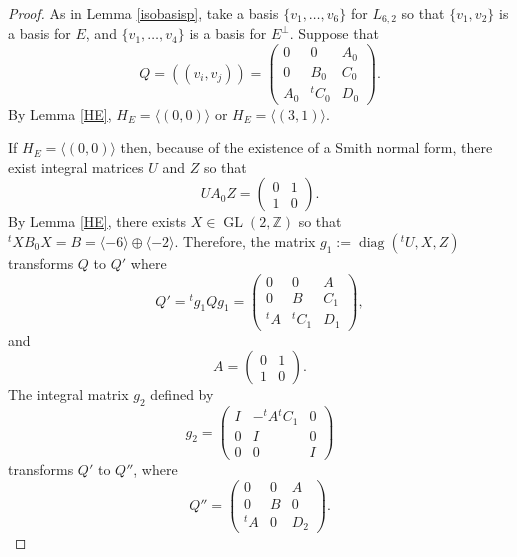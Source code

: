 \documentclass[11pt]{amsart}
\newcommand{\ZZ}{\mathbb{Z}}
\newcommand{\la}{\langle}
\newcommand{\ra}{\rangle}
\newcommand{\opn}{\operatorname}
\newcommand{\op}{\oplus}
\begin{document}
\begin{proof}
As in Lemma \ref{isobasisp}, take a basis $\{v_1, \ldots, v_6 \}$ for $L_{6,2}$ so that $\{v_1, v_2\}$ is a basis for $E$, and $\{v_1, \ldots, v_4 \}$ is a basis for $E^{\perp}$. 
Suppose that
\begin{equation*}
Q = ((v_i, v_j)) = 
\begin{pmatrix} 
0 & 0 & A_0 \\ 
0 & B_0 & C_0 \\ 
A_0 & {}^tC_0 & D_0 
\end{pmatrix}.
\end{equation*}
By Lemma \ref{HE}, $H_E = \la (0,0) \ra$ or $H_E = \la (3,1) \ra$. 

If $H_E = \la (0,0) \ra$ then, because of the existence of a Smith normal form, there exist integral matrices $U$ and $Z$ so that 
\begin{equation*}
U A_0 Z = 
\begin{pmatrix} 
0 & 1 \\ 
1 & 0 
\end{pmatrix}.
\end{equation*}
By Lemma \ref{HE}, there exists $X \in \opn{GL}(2, \ZZ)$ so that ${}^tX B_0 X = B = \la -6 \ra \op \la -2 \ra$.
Therefore, the matrix $g_1:=\opn{diag}({}^tU, X, Z)$ transforms $Q$ to $Q'$ where
\begin{equation*}
Q' = {}^tg_1Qg_1 
=
\begin{pmatrix} 
0 & 0 & A \\ 
0 & B & C_1 \\ 
{}^t A & {}^t C_1 & D_1 
\end{pmatrix},
\end{equation*}
and
\begin{equation*}
A =
\begin{pmatrix}
0 & 1 \\
1 & 0 
\end{pmatrix}.
\end{equation*} 
The integral matrix $g_2$ defined by  
\begin{equation*}
g_2=
\begin{pmatrix} 
I & -{}^tA {}^t C_1 & 0 \\ 
0 & I & 0 \\ 
0 & 0 & I 
\end{pmatrix}
\end{equation*}
transforms $Q'$ to $Q''$, where
\begin{equation*}
Q'' = 
\begin{pmatrix} 
0 & 0 & A \\ 
0 & B & 0 \\ 
{}^t A & 0 & D_2 
\end{pmatrix}.
\end{equation*}


\end{proof}
\end{document}
